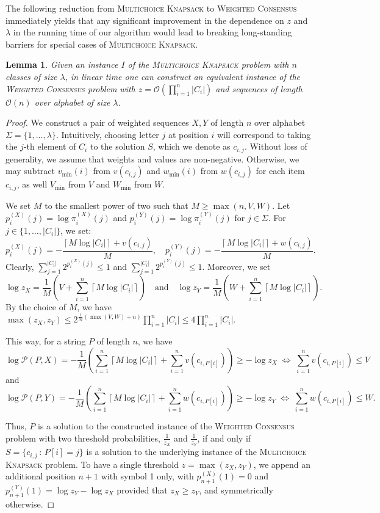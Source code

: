\documentclass{article}
\theoremstyle{plain}
\newtheorem{lemma}[theorem]{Lemma}
\theoremstyle{definition}
\newcommand{\MK}{\textsc{Multichoice Knapsack}\xspace}
\newcommand{\WC}{\textsc{Weighted Consensus}\xspace}
\newcommand{\ceil}[1]{\left\lceil #1 \right\rceil}
\newcommand{\Oh}{\mathcal{O}}
\renewcommand{\P}{\mathcal{P}}
\begin{document}
    The following reduction from \MK to \WC immediately yields that any significant improvement in the dependence
    on $z$ and $\lambda$ in the running time of our algorithm
    would lead to breaking long-standing barriers for special cases of \MK.
   \begin{lemma}\label{lem:red}
    Given an instance $I$ of the \MK problem with $n$ classes of size $\lambda$, in linear time one can construct
    an equivalent instance of the \WC problem with $z=\Oh(\prod_{i=1}^{n}|C_i|)$ and sequences of length $\Oh(n)$ over alphabet of size $\lambda$.
  \end{lemma}
    \begin{proof}
    We construct a pair of weighted sequences $X,Y$ of length $n$
    over alphabet $\Sigma=\{1,\ldots,\lambda\}$. 
    Intuitively, choosing letter $j$ at position $i$ will correspond to taking the $j$-th element of $C_i$ to the solution $S$,
    which we denote as $c_{i,j}$.
    Without loss of generality, we assume that weights and values are non-negative. Otherwise, we may subtract $v_{\min}(i)$ from $v(c_{i,j})$
    and $w_{\min}(i)$ from $w(c_{i,j})$ for each item $c_{i,j}$, as well $V_{\min}$ from $V$ and $W_{\min}$ from $W$.
    
    We set $M$ to the smallest power of two such that $M\ge\max(n, V, W)$.
    Let $p_i^{(X)}(j) = \log \pi_i^{(X)}(j)$ and $p_i^{(Y)}(j) = \log \pi_i^{(Y)}(j)$ for $j \in \Sigma$.
    For $j\in \{1,\ldots,|C_i|\}$, we set:
    $$p_i^{(X)}(j) = -\frac{\ceil{M\log|C_i|} + v(c_{i,j})}{M}, \quad p_i^{(Y)}(j)=-\frac{\ceil{M\log|C_i|} +w(c_{i,j})}{M}.$$
    Clearly, $\sum_{j=1}^{|C_i|} 2^{p_i^{(X)}(j)}\le 1$ and $\sum_{j=1}^{|C_i|} 2^{p_i^{(Y)}(j)}\le 1$.
    Moreover,
    we set 
    $$\log z_X = \frac1M \left(V + \sum_{i=1}^n\ceil{M\log|C_i|}\right)   \quad \text{and} \quad \log z_Y = \frac1M\left(W + \sum_{i=1}^n\ceil{M\log|C_i|}\right).$$
    By the choice of $M$, we have $\max(z_X,z_Y) \le 2^{\frac1M(\max(V,W)+n)}\prod_{i=1}^{n}|C_i|\le 4\prod_{i=1}^{n}|C_i|$. 
    
    This way, for a string $P$ of length $n$, we have 
    $$\log \P(P,X)=-\frac1M\left(\sum_{i=1}^n\ceil{M\log|C_i|}+\sum_{i=1}^n v(c_{i,P[i]})\right) \ge -\log z_X \; \Longleftrightarrow \; \sum_{i=1}^n
     v(c_{i,P[i]}) \le V$$
    and 
    $$\log \P(P,Y)=-\frac1M\left(\sum_{i=1}^n\ceil{M\log|C_i|}+\sum_{i=1}^n w(c_{i,P[i]})\right) \ge -\log z_Y \; \Longleftrightarrow \; \sum_{i=1}^n
     w(c_{i,P[i]}) \le W.$$
    
    Thus, $P$ is a solution to the constructed instance of the \WC problem with two threshold probabilities, $\frac{1}{z_X}$ and $\frac{1}{z_Y}$,
    if and only if $S = \{c_{i,j}\,:\,P[i]=j\}$ is a solution to the underlying instance of the \MK problem.
    To have a single threshold $z=\max(z_X,z_Y)$, we append an additional position $n+1$ with symbol 1 only, 
    with $p_{n+1}^{(X)}(1)=0$ and $p_{n+1}^{(Y)}(1)=\log z_Y - \log z_X$ provided that $z_X \ge z_Y$,
    and symmetrically otherwise.
    

\end{proof}
\end{document}
